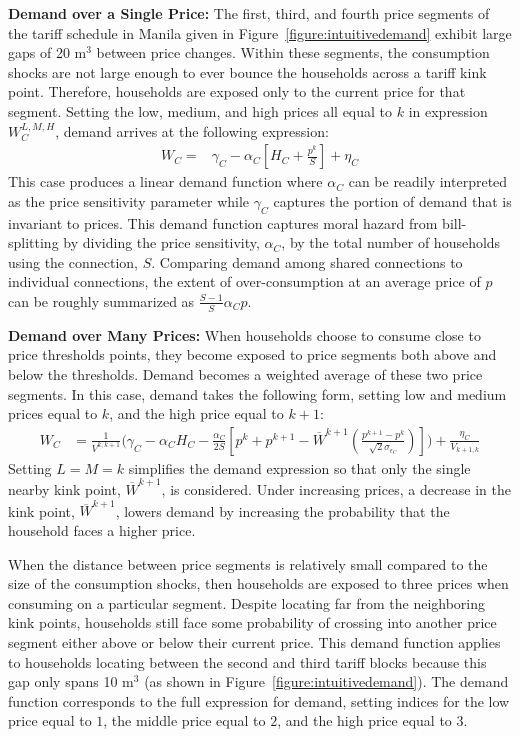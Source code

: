 \documentclass[12pt]{article}
\begin{document}
\begin{appendices}
\textbf{  Demand over a Single Price:  }  The first, third, and fourth price segments of the tariff schedule in Manila given in Figure~\ref{figure:intuitivedemand} exhibit large gaps of 20 $\text{m}^{3}$ between price changes.  Within these segments, the consumption shocks are not large enough to ever bounce the households across a tariff kink point.  Therefore, households are exposed only to the current price for that segment.  Setting the low, medium, and high prices all equal to $k$ in expression $W^{L,M,H}_C$, demand arrives at the following expression:
\begin{align*}
  W_C  =& \gamma_C - \alpha_C [ H_{C} + \frac{p^k}{S} ] + \eta_C 
\end{align*}
This case produces a linear demand function where $\alpha_C$ can be readily interpreted as the price sensitivity parameter while $\gamma_C$ captures the portion of demand that is invariant to prices.  This demand function captures moral hazard from bill-splitting by dividing the price sensitivity, $\alpha_C$, by the total number of households using the connection, $S$.  Comparing demand among shared connections to individual connections, the extent of over-consumption at an average price of $p$ can be roughly summarized as $\frac{S-1}{S} \alpha_C p $.   

\textbf{ Demand over Many Prices: }  When households choose to consume close to price thresholds points, they become exposed to price segments both above and below the thresholds.  Demand becomes a weighted average of these two price segments.  In this case, demand takes the following form, setting low and medium prices equal to $k$, and the high price equal to $k+1$:
\begin{align*}
W_C &= \frac{ 1}{ V^{k,k+1} } \Big ( \gamma_C - \alpha_C H_{C} - \frac{\alpha_C}{2 S}  [ p^{k} + p^{k+1} - \overline{W}^{k+1} (\frac{p^{k+1} - p^{k}}{\sqrt{2}{\sigma_{\epsilon_C}}})  ]  \Big ) + \frac{ \eta_C }{ V_{k+1,k} } 
\end{align*}
Setting $L=M=k$ simplifies the demand expression so that only the single nearby kink point, $\overline{W}^{k+1}$, is considered.  Under increasing prices, a decrease in the kink point, $\overline{W}^{k+1}$, lowers demand by increasing the probability that the household faces a higher price.

When the distance between price segments is relatively small compared to the size of the consumption shocks, then households are exposed to three prices when consuming on a particular segment.  Despite locating far from the neighboring kink points, households still face some probability of crossing into another price segment either above or below their current price.  This demand function applies to households locating between the second and third tariff blocks because this gap only spans 10 $\text{m}^{3}$ (as shown in Figure~\ref{figure:intuitivedemand}).  The demand function corresponds to the full expression for demand, setting indices for the low price equal to $1$, the middle price equal to $2$, and the high price equal to $3$.  



\end{appendices}
\end{document}
